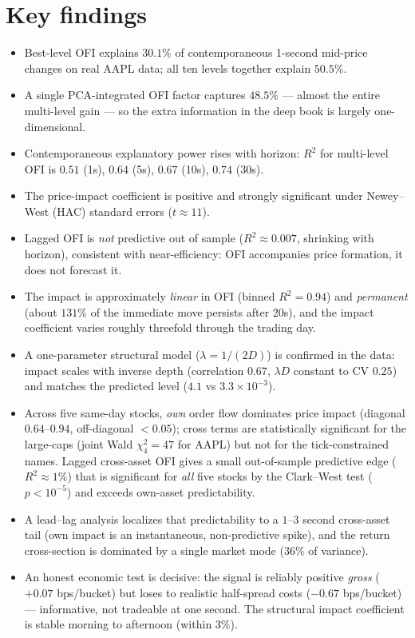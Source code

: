 \documentclass[11pt]{article}
\begin{document}
\section*{Key findings}
\begin{itemize}
\item Best-level OFI explains $30.1\%$ of contemporaneous 1-second mid-price
changes on real AAPL data; all ten levels together explain $50.5\%$.
\item A single PCA-integrated OFI factor captures $48.5\%$ --- almost the entire
multi-level gain --- so the extra information in the deep book is largely
one-dimensional.
\item Contemporaneous explanatory power rises with horizon: $R^2$ for multi-level
OFI is $0.51$ (1s), $0.64$ (5s), $0.67$ (10s), $0.74$ (30s).
\item The price-impact coefficient is positive and strongly significant under
Newey--West (HAC) standard errors ($t\approx 11$).
\item Lagged OFI is \emph{not} predictive out of sample ($R^2\approx 0.007$,
shrinking with horizon), consistent with near-efficiency: OFI accompanies price
formation, it does not forecast it.
\item The impact is approximately \emph{linear} in OFI (binned $R^2=0.94$) and
\emph{permanent} (about $131\%$ of the immediate move persists after 20s), and the
impact coefficient varies roughly threefold through the trading day.
\item A one-parameter structural model ($\lambda = 1/(2D)$) is confirmed in the
data: impact scales with inverse depth (correlation $0.67$, $\lambda D$ constant to
CV $0.25$) and matches the predicted level ($4.1$ vs $3.3\times10^{-3}$).
\item Across five same-day stocks, \emph{own} order flow dominates price impact
(diagonal $0.64$--$0.94$, off-diagonal $<0.05$); cross terms are statistically
significant for the large-caps (joint Wald $\chi^2_4=47$ for AAPL) but not for the
tick-constrained names. Lagged cross-asset OFI gives a small out-of-sample
predictive edge ($R^2\approx 1\%$) that is significant for \emph{all} five stocks by
the Clark--West test ($p<10^{-5}$) and exceeds own-asset predictability.
\item A lead--lag analysis localizes that predictability to a $1$--$3$ second
cross-asset tail (own impact is an instantaneous, non-predictive spike), and the
return cross-section is dominated by a single market mode ($36\%$ of variance).
\item An honest economic test is decisive: the signal is reliably positive
\emph{gross} ($+0.07$ bps/bucket) but loses to realistic half-spread costs
($-0.67$ bps/bucket) --- informative, not tradeable at one second. The structural
impact coefficient is stable morning to afternoon (within $3\%$).
\end{itemize}
\bigskip
\end{document}
